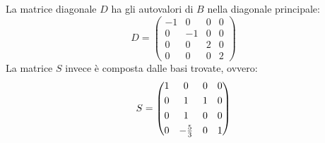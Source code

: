 \documentclass[a4paper]{article}
\makeatletter
\newenvironment{rowequmat}[1]{\left(\array{@{}#1@{}}}{\endarray\right)}
\makeatother
\begin{document}
	\noindent
	La matrice diagonale $D$ ha gli autovalori di $B$ nella diagonale principale:
	\begin{equation*}
		D = \begin{pmatrix}
			-1 & 0 & 0 & 0 \\
			0 & -1 & 0 & 0 \\
			0 & 0 & 2 & 0 \\
			0 & 0 & 0 & 2 
		\end{pmatrix}
	\end{equation*}
	La matrice $S$ invece è composta dalle basi trovate, ovvero:
	\begin{equation*}
		S = \begin{rowequmat}{cccc}
			1 & 0				& 0 & 0 \\ [.3em]
			0 & 1				& 1 & 0 \\ [.3em]
			0 & 1				& 0 & 0 \\ [.3em]
			0 & -\frac{5}{3}	& 0 & 1
		\end{rowequmat}
	\end{equation*}\newpage
	
\end{document}
